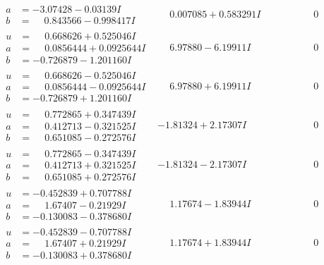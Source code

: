 \documentclass[1p]{elsarticle_modified}
\theoremstyle{definition}
\begin{document}
$$\begin{array}{c|c|c}
\begin{aligned}
a &= -3.07428 - 0.03139 I \\
b &= \phantom{-}0.843566 - 0.998417 I\end{aligned}
 & \phantom{-}0.007085 + 0.583291 I & \phantom{-0.000000 } 0 \\ \hline\begin{aligned}
u &= \phantom{-}0.668626 + 0.525046 I \\
a &= \phantom{-}0.0856444 + 0.0925644 I \\
b &= -0.726879 - 1.201160 I\end{aligned}
 & \phantom{-}6.97880 - 6.19911 I & \phantom{-0.000000 } 0 \\ \hline\begin{aligned}
u &= \phantom{-}0.668626 - 0.525046 I \\
a &= \phantom{-}0.0856444 - 0.0925644 I \\
b &= -0.726879 + 1.201160 I\end{aligned}
 & \phantom{-}6.97880 + 6.19911 I & \phantom{-0.000000 } 0 \\ \hline\begin{aligned}
u &= \phantom{-}0.772865 + 0.347439 I \\
a &= \phantom{-}0.412713 - 0.321525 I \\
b &= \phantom{-}0.651085 - 0.272576 I\end{aligned}
 & -1.81324 + 2.17307 I & \phantom{-0.000000 } 0 \\ \hline\begin{aligned}
u &= \phantom{-}0.772865 - 0.347439 I \\
a &= \phantom{-}0.412713 + 0.321525 I \\
b &= \phantom{-}0.651085 + 0.272576 I\end{aligned}
 & -1.81324 - 2.17307 I & \phantom{-0.000000 } 0 \\ \hline\begin{aligned}
u &= -0.452839 + 0.707788 I \\
a &= \phantom{-}1.67407 - 0.21929 I \\
b &= -0.130083 - 0.378680 I\end{aligned}
 & \phantom{-}1.17674 - 1.83944 I & \phantom{-0.000000 } 0 \\ \hline\begin{aligned}
u &= -0.452839 - 0.707788 I \\
a &= \phantom{-}1.67407 + 0.21929 I \\
b &= -0.130083 + 0.378680 I\end{aligned}
 & \phantom{-}1.17674 + 1.83944 I & \phantom{-0.000000 } 0 \\ \hline\begin{aligned}

\end{aligned}
\end{array}$$
\end{document}

